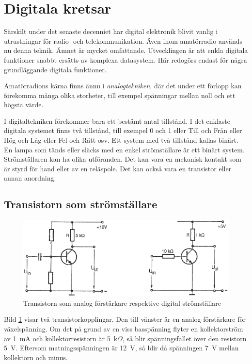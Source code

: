 \section{Digitala kretsar}
\label{digitala kretsar}

Särskilt under det senaste decenniet har digital elektronik blivit vanlig i
utrustningar för radio- och telekommunikation. Även inom amatörradio används nu
denna teknik. Ämnet är mycket omfattande. Utvecklingen är att enkla digitala
funktioner snabbt ersätts av komplexa datasystem. Här redogörs endast för några
grundläggande digitala funktioner.

Amatörradions kärna finns ännu i \emph{analogtekniken}, där det under ett
förlopp kan förekomma många olika storheter, till exempel spänningar mellan noll och
ett högsta värde.

I digitaltekniken förekommer bara ett bestämt antal tillstånd. I det enklaste
digitala systemet finns två tillstånd, till exempel 0 och 1 eller Till och Från eller
Hög och Låg eller Fel och Rätt osv. Ett system med två tillstånd kallas
binärt. En lampa som tänds eller släcks med en enkel strömställare är ett binärt
system. Strömställaren kan ha olika utföranden. Det kan vara en mekanisk kontakt
som är styrd för hand eller av en reläspole. Det kan också vara en transistor
eller annan anordning.

\subsection{Transistorn som strömställare}

\begin{figure}
\includegraphics[width=\textwidth]{images/cropped_pdfs/bild_2_2-35.pdf}
\caption{Transistorn som analog förstärkare respektive digital strömställare}
\label{fig:BildII2-35}
\end{figure}

Bild \ref{fig:BildII2-35} visar två transistorkopplingar.
Den till vänster är en analog förstärkare för växelspänning.
Om det på grund av en viss basspänning flyter en kollektorström av 1~mA och
kollektorresistorn är 5~k\(\Omega\), så blir spänningsfallet
över den resistorn 5~V. Eftersom matningsspänningen är 12~V, så blir då
spänningen 7~V mellan kollektorn och minus.

